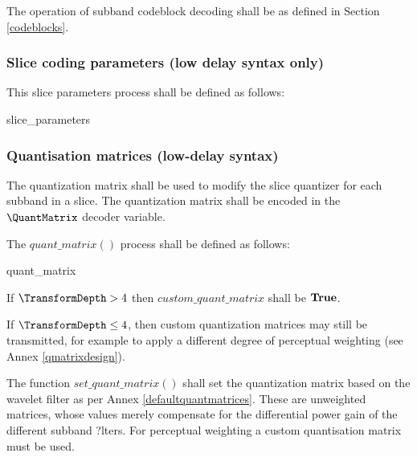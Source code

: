 The operation of subband codeblock decoding shall be as defined in Section \ref{codeblocks}.

\subsubsection{Slice coding parameters (low delay syntax only)}
\label{sliceparams}

This slice parameters process shall be defined as follows:

\begin{pseudo}{slice\_parameters}{}
\end{pseudo}

\subsubsection{Quantisation matrices (low-delay syntax)}
\label{quantmatrix}

The quantization matrix shall be used to modify the slice quantizer for each subband in
 a slice. The quantization matrix shall be encoded in the $\QuantMatrix$ decoder variable. 

The $quant\_matrix()$ process shall be defined as follows:

\begin{pseudo}{quant\_matrix}{}
    \bsEND
\bsELSE
\bsEND
\end{pseudo}

If $\TransformDepth> 4$ then $custom\_quant\_matrix$  shall be $\text{\bf{True}}$. 

If $\TransformDepth \leq 4$, then custom quantization 
matrices may still be transmitted, 
for example to apply a different degree of perceptual weighting 
(see Annex \ref{qmatrixdesign}). 

The function $set\_quant\_matrix()$ shall set the quantization matrix 
based on the wavelet filter as per Annex \ref{defaultquantmatrices}. These are 
unweighted matrices, whose values merely compensate for the differential power 
gain of the different subband ?lters. For perceptual weighting a custom 
quantisation matrix must be used.

